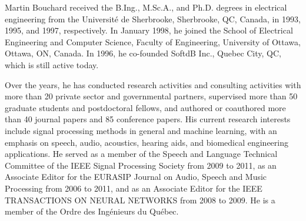 \documentclass{ieeeaccess}
\begin{document}
\begin{IEEEbiography}{Martin Bouchard } received the B.Ing., M.Sc.A., and Ph.D. degrees in electrical engineering from the Université de Sherbrooke, Sherbrooke, QC, Canada, in 1993, 1995, and 1997, respectively. In January 1998, he joined the School of Electrical Engineering and Computer Science, Faculty of Engineering, University of Ottawa, Ottawa, ON, Canada. In 1996, he co-founded SoftdB Inc., Quebec City, QC, which is still active today.
	
Over the years, he has conducted research activities and consulting activities with more than 20 private sector and governmental partners, supervised more than 50 graduate students and postdoctoral fellows, and authored or coauthored more than 40 journal papers and 85 conference papers. His current research interests include signal processing methods in general and machine learning, with an emphasis on speech, audio, acoustics, hearing aids, and biomedical engineering applications. He served as a member of the Speech and Language Technical Committee of the IEEE Signal Processing Society from 2009 to 2011, as an Associate Editor for the EURASIP Journal on Audio, Speech and Music Processing from 2006 to 2011, and as an Associate Editor for the IEEE TRANSACTIONS ON NEURAL NETWORKS from 2008 to 2009. He is a member of the Ordre des Ingénieurs du Québec. 
\end{IEEEbiography}

\EOD
\end{document}
